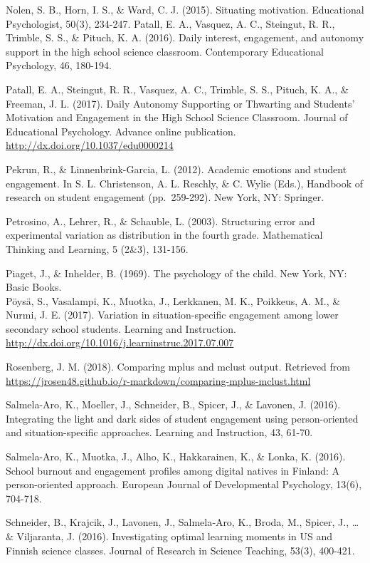\documentclass[]{book}
\theoremstyle{definition}
\theoremstyle{definition}
\theoremstyle{definition}
\theoremstyle{remark}
\begin{document}
Nolen, S. B., Horn, I. S., \& Ward, C. J. (2015). Situating motivation.
Educational Psychologist, 50(3), 234-247. Patall, E. A., Vasquez, A. C.,
Steingut, R. R., Trimble, S. S., \& Pituch, K. A. (2016). Daily
interest, engagement, and autonomy support in the high school science
classroom. Contemporary Educational Psychology, 46, 180-194.

Patall, E. A., Steingut, R. R., Vasquez, A. C., Trimble, S. S., Pituch,
K. A., \& Freeman, J. L. (2017). Daily Autonomy Supporting or Thwarting
and Students' Motivation and Engagement in the High School Science
Classroom. Journal of Educational Psychology. Advance online
publication. \url{http://dx.doi.org/10.1037/edu0000214}

Pekrun, R., \& Linnenbrink-Garcia, L. (2012). Academic emotions and
student engagement. In S. L. Christenson, A. L. Reschly, \& C. Wylie
(Eds.), Handbook of research on student engagement (pp.~259-292). New
York, NY: Springer.

Petrosino, A., Lehrer, R., \& Schauble, L. (2003). Structuring error and
experimental variation as distribution in the fourth grade. Mathematical
Thinking and Learning, 5 (2\&3), 131-156.

Piaget, J., \& Inhelder, B. (1969). The psychology of the child. New
York, NY: Basic Books.\\
Pöysä, S., Vasalampi, K., Muotka, J., Lerkkanen, M. K., Poikkeus, A. M.,
\& Nurmi, J. E. (2017). Variation in situation-specific engagement among
lower secondary school students. Learning and Instruction.
\url{http://dx.doi.org/10.1016/j.learninstruc.2017.07.007}

Rosenberg, J. M. (2018). Comparing mplus and mclust output. Retrieved
from
\url{https://jrosen48.github.io/r-markdown/comparing-mplus-mclust.html}

Salmela-Aro, K., Moeller, J., Schneider, B., Spicer, J., \& Lavonen, J.
(2016). Integrating the light and dark sides of student engagement using
person-oriented and situation-specific approaches. Learning and
Instruction, 43, 61-70.

Salmela-Aro, K., Muotka, J., Alho, K., Hakkarainen, K., \& Lonka, K.
(2016). School burnout and engagement profiles among digital natives in
Finland: A person-oriented approach. European Journal of Developmental
Psychology, 13(6), 704-718.

Schneider, B., Krajcik, J., Lavonen, J., Salmela‐Aro, K., Broda, M.,
Spicer, J., \ldots{} \& Viljaranta, J. (2016). Investigating optimal
learning moments in US and Finnish science classes. Journal of Research
in Science Teaching, 53(3), 400-421.
\end{document}
